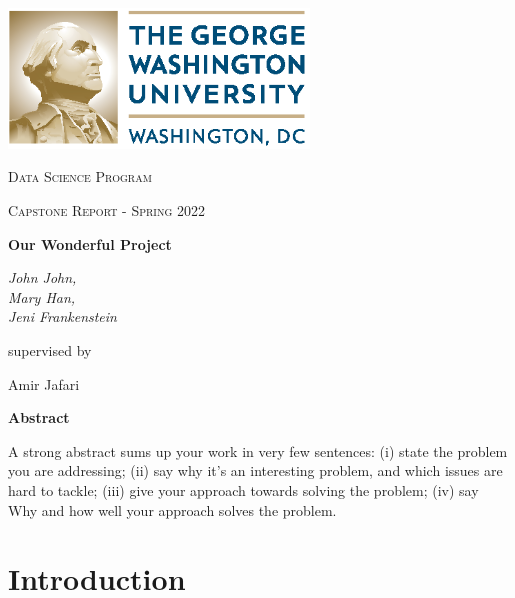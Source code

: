 \documentclass{scrartcl}
\renewenvironment{abstract}{
    \centering
    \textbf{Abstract}
    \vspace{0.5cm}
    \par\itshape
    \begin{minipage}{0.7\linewidth}}{\end{minipage}
    \noindent\ignorespaces
}
\begin{document}
\begin{titlepage}
	\centering
	\includegraphics[width=0.6\textwidth]{GW_logo.eps}\par
	\vspace{2cm}
	{\scshape\LARGE Data Science Program \par}
	\vspace{1cm}
	{\scshape\Large Capstone Report - Spring 2022\par}
	\vspace{1.5cm}
	{\huge\bfseries Our Wonderful Project\par}
	\vspace{2cm}
	{\Large\itshape John John,\\ Mary Han,\\ Jeni Frankenstein\\}\par
	\vspace{1.5cm}
	supervised by\par
	Amir Jafari

	\vfill
	\begin{abstract}
	    A strong abstract sums up your work in very few sentences:
	    (i) state the problem you are addressing;
	    (ii) say why it’s an interesting problem, and which issues are hard to tackle;
	    (iii) give your approach towards solving the problem;
	    (iv) say Why and how well your approach solves the problem.
	\end{abstract}
	\vfill
\end{titlepage}
\tableofcontents
\newpage
\section{Introduction}
\end{document}
